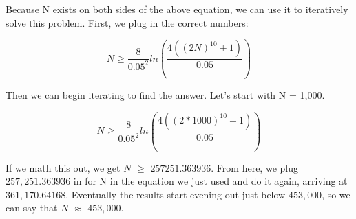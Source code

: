 \documentclass[11pt]{article}
\begin{document}
Because N exists on both sides of the above equation, we can use it to iteratively solve this problem. First, we plug in the correct numbers:

\begin{equation*}
N \geq \frac{8}{0.05^2} ln (\frac{4((2N)^{10} + 1)}{0.05})
\end{equation*}

Then we can begin iterating to find the answer. Let's start with N = 1,000.

\begin{equation*}
N \geq \frac{8}{0.05^2} ln (\frac{4((2 * 1000)^{10} + 1)}{0.05})
\end{equation*}

If we math this out, we get $N$ $\geq$ $257251.363936$. From here, we plug $257,251.363936$ in for N in the equation we just used and do it again, arriving at $361,170.64168$. Eventually the results start evening out just below $453,000$, so we can say that $N$ $\approx$ $453,000$.
\end{document}

